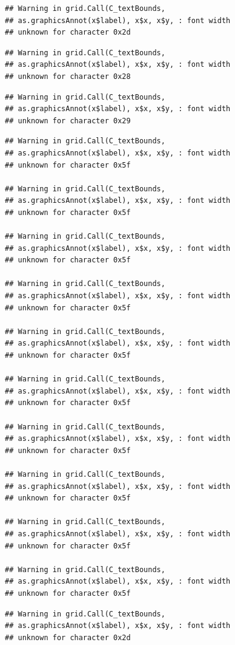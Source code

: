 \documentclass[
]{book}
\begin{document}
\begin{verbatim}
## Warning in grid.Call(C_textBounds,
## as.graphicsAnnot(x$label), x$x, x$y, : font width
## unknown for character 0x2d
\end{verbatim}

\begin{verbatim}
## Warning in grid.Call(C_textBounds,
## as.graphicsAnnot(x$label), x$x, x$y, : font width
## unknown for character 0x28
\end{verbatim}

\begin{verbatim}
## Warning in grid.Call(C_textBounds,
## as.graphicsAnnot(x$label), x$x, x$y, : font width
## unknown for character 0x29
\end{verbatim}

\begin{verbatim}
## Warning in grid.Call(C_textBounds,
## as.graphicsAnnot(x$label), x$x, x$y, : font width
## unknown for character 0x5f

## Warning in grid.Call(C_textBounds,
## as.graphicsAnnot(x$label), x$x, x$y, : font width
## unknown for character 0x5f

## Warning in grid.Call(C_textBounds,
## as.graphicsAnnot(x$label), x$x, x$y, : font width
## unknown for character 0x5f

## Warning in grid.Call(C_textBounds,
## as.graphicsAnnot(x$label), x$x, x$y, : font width
## unknown for character 0x5f

## Warning in grid.Call(C_textBounds,
## as.graphicsAnnot(x$label), x$x, x$y, : font width
## unknown for character 0x5f

## Warning in grid.Call(C_textBounds,
## as.graphicsAnnot(x$label), x$x, x$y, : font width
## unknown for character 0x5f

## Warning in grid.Call(C_textBounds,
## as.graphicsAnnot(x$label), x$x, x$y, : font width
## unknown for character 0x5f

## Warning in grid.Call(C_textBounds,
## as.graphicsAnnot(x$label), x$x, x$y, : font width
## unknown for character 0x5f

## Warning in grid.Call(C_textBounds,
## as.graphicsAnnot(x$label), x$x, x$y, : font width
## unknown for character 0x5f

## Warning in grid.Call(C_textBounds,
## as.graphicsAnnot(x$label), x$x, x$y, : font width
## unknown for character 0x5f
\end{verbatim}

\begin{verbatim}
## Warning in grid.Call(C_textBounds,
## as.graphicsAnnot(x$label), x$x, x$y, : font width
## unknown for character 0x2d
\end{verbatim}
\end{document}
